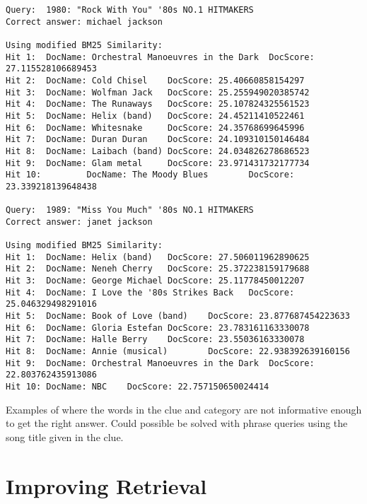\documentclass[11pt,letterpaper]{article}
\begin{document}
\begin{table*}[tbh!]
	\small
\begin{verbatim}
Query:  1980: "Rock With You" '80s NO.1 HITMAKERS
Correct answer: michael jackson

Using modified BM25 Similarity:
Hit 1:  DocName: Orchestral Manoeuvres in the Dark  DocScore: 27.115528106689453
Hit 2:  DocName: Cold Chisel    DocScore: 25.40660858154297
Hit 3:  DocName: Wolfman Jack   DocScore: 25.255949020385742
Hit 4:  DocName: The Runaways   DocScore: 25.107824325561523
Hit 5:  DocName: Helix (band)   DocScore: 24.45211410522461
Hit 6:  DocName: Whitesnake     DocScore: 24.35768699645996
Hit 7:  DocName: Duran Duran    DocScore: 24.109310150146484
Hit 8:  DocName: Laibach (band) DocScore: 24.034826278686523
Hit 9:  DocName: Glam metal     DocScore: 23.971431732177734
Hit 10:         DocName: The Moody Blues        DocScore: 23.339218139648438

Query:  1989: "Miss You Much" '80s NO.1 HITMAKERS
Correct answer: janet jackson

Using modified BM25 Similarity:
Hit 1:  DocName: Helix (band)   DocScore: 27.506011962890625
Hit 2:  DocName: Neneh Cherry   DocScore: 25.372238159179688
Hit 3:  DocName: George Michael DocScore: 25.11778450012207
Hit 4:  DocName: I Love the '80s Strikes Back   DocScore: 25.046329498291016
Hit 5:  DocName: Book of Love (band)    DocScore: 23.877687454223633
Hit 6:  DocName: Gloria Estefan DocScore: 23.783161163330078
Hit 7:  DocName: Halle Berry    DocScore: 23.55036163330078
Hit 8:  DocName: Annie (musical)        DocScore: 22.938392639160156
Hit 9:  DocName: Orchestral Manoeuvres in the Dark  DocScore: 22.803762435913086
Hit 10: DocName: NBC    DocScore: 22.757150650024414
\end{verbatim}
\normalsize
\caption{Examples of where the words in the clue and category are not informative enough to get the right answer. Could possible be solved with phrase queries using the song title given in the clue.}
\label{table-category}
\end{table*}

\section{Improving Retrieval}
\end{document}
